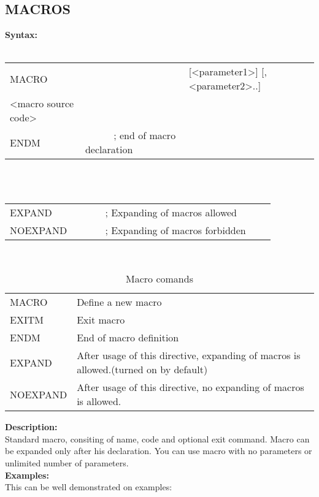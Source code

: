 {        \subsection{MACROS}
        \textbf{Syntax:}\\
        \\ {
            \texttt{}
                \begin{tabular}[h!]{llll}
                    { \color{highlight_directive} MACRO } & \verb'     ' &
                    { \color{highlight_constant} [<parameter1>]  [,<parameter2>..] }\\
                    { \color{highlight_symbol} <macro source code> }\\
                    { \color{highlight_directive} ENDM } &  \verb'     ' { \color{highlight_comment} ; end of macro declaration  }
                \end{tabular}
            }\\
        \\ {
            \texttt{}
                \begin{tabular}[h!]{llll}
                    { \color{highlight_directive} EXPAND } &  \verb'     ' { \color{highlight_comment} ; Expanding of macros allowed  }\\
                    { \color{highlight_directive} NOEXPAND } &  \verb'     ' { \color{highlight_comment} ; Expanding of macros forbidden  }
                \end{tabular}
            }\\
        \begin{table}[h!]
            \begin{tabular}{|ll|}
                    \hline
                    MACRO      & Define a new macro \\
                    EXITM      & Exit macro  \\
                    ENDM       & End of macro definition \\
                    EXPAND     & After usage of this directive, expanding of macros is allowed.(turned on by default)\\
                    NOEXPAND   & After usage of this directive, no expanding of macros is allowed.\\
                    \hline
            \end{tabular}
            \caption{Macro comands}
        \end{table}
        \textbf{Description:}\\
        Standard macro, consiting of name, code and optional exit command. Macro can be expanded only after his declaration. You can use macro
        with no parameters  or unlimited number of parameters.\\
        \textbf{Examples:}\\
        This can be well demonstrated on examples:
        {
            ~\\
            \usecodefont

}}
